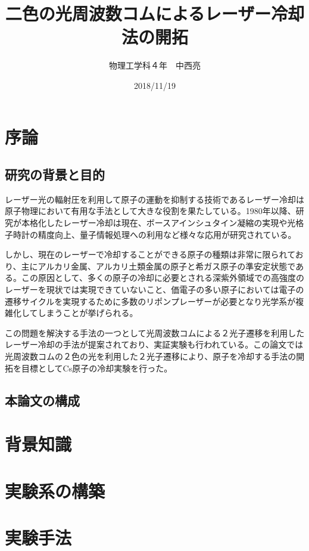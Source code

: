 \documentclass[uplatex,dvipdfmx,a4paper,report,papersize,11pt]{jsbook}
\title{二色の光周波数コムによるレーザー冷却法の開拓}
\author{物理工学科４年　中西亮}
\date{2018/11/19}
\begin{document}
\maketitle
\newpage

\setcounter{tocdepth}{2}
\tableofcontents


\newpage
\chapter{序論}
\section{研究の背景と目的}
レーザー光の輻射圧を利用して原子の運動を抑制する技術であるレーザー冷却は原子物理において有用な手法として大きな役割を果たしている。1980年以降、研究が本格化したレーザー冷却は現在、ボースアインシュタイン凝縮の実現や光格子時計の精度向上、量子情報処理への利用など様々な応用が研究されている。\cite{レーザー冷却とその応用}\par
しかし、現在のレーザーで冷却することができる原子の種類は非常に限られており、主にアルカリ金属、アルカリ土類金属の原子と希ガス原子の準安定状態である。\cite{PhysRevA.73.063407}この原因として、多くの原子の冷却に必要とされる深紫外領域での高強度のレーザーを現状では実現できていないこと、価電子の多い原子においては電子の遷移サイクルを実現するために多数のリポンプレーザーが必要となり光学系が複雑化してしまうことが挙げられる。\par
この問題を解決する手法の一つとして光周波数コムによる２光子遷移を利用したレーザー冷却の手法が提案されており、実証実験も行われている\cite{PhysRevX.6.041004}\cite{PhysRevA.73.063407}。この論文では光周波数コムの２色の光を利用した２光子遷移により、原子を冷却する手法の開拓を目標としてCs原子の冷却実験を行った。\\



\section{本論文の構成}

\newpage
\chapter{背景知識}

\newpage
\chapter{実験系の構築}







\chapter{実験手法}





\end{document}
